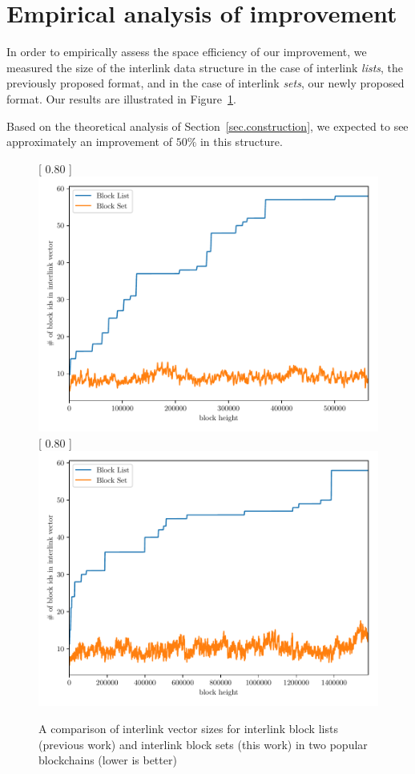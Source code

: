 \section{Empirical analysis of improvement}

In order to empirically assess the space efficiency of our improvement, we
measured the size of the interlink data structure in the case of interlink
\emph{lists}, the previously proposed format, and in the case of interlink
\emph{sets}, our newly proposed format. Our results are illustrated in
Figure~\ref{fig.set-list-vector-comparison}.

Based on the theoretical analysis of Section~\ref{sec.construction}, we expected
to see approximately an improvement of $50\%$ in this structure.

\begin{figure}
   \centering
   [
       0.80\textwidth
   ]
   {
       \includegraphics[width=0.85 \textwidth]
       {figures/interlink-vector-blocklist-vs-blockset.pdf}
   }
   \vskip 0pt
   [
       0.80\textwidth
   ]
   {
       \includegraphics[width=0.85 \textwidth]
       {figures/interlink-vector-blocklist-vs-blockset-litecoin.pdf}
   }
   \caption{A comparison of interlink vector sizes for interlink block lists (previous work) and interlink block sets (this work) in two popular blockchains (lower is better)}
   \label{fig.set-list-vector-comparison}
\end{figure}

